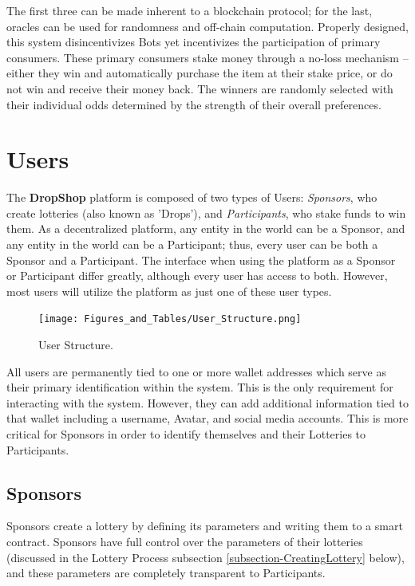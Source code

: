 \documentclass[runningheads]{llncs}
\begin{document}
The first three can be made inherent to a blockchain protocol; for the last, oracles can be used for randomness and off-chain computation.  Properly designed, this system disincentivizes Bots yet incentivizes the participation of primary consumers.  These primary consumers stake money through a no-loss mechanism – either they win and automatically purchase the item at their stake price, or do not win and receive their money back.  The winners are randomly selected with their individual odds determined by the strength of their overall preferences.


\section{Users}\label{section-Users}

The \textbf{DropShop} platform is composed of two types of Users: \emph{Sponsors}, who create lotteries (also known as 'Drops'), and \emph{Participants}, who stake funds to win them.  As a decentralized platform, any entity in the world can be a Sponsor, and any entity in the world can be a Participant; thus, every user can be both a Sponsor and a Participant.  The interface when using the platform as a Sponsor or Participant differ greatly, although every user has access to both.  However, most users will utilize the platform as just one of these user types.

\begin{figure}[H]
\centering
\texttt{[image: Figures\_and\_Tables/User\_Structure.png]}
\caption{User Structure.}
\end{figure}

All users are permanently tied to one or more wallet addresses which serve as their primary identification within the system.  This is the only requirement for interacting with the system. However, they can add additional information tied to that wallet including a username, Avatar, and social media accounts.  This is more critical for Sponsors in order to identify themselves and their Lotteries to Participants.

\subsection{Sponsors}\label{subsection-Sponsors}
Sponsors create a lottery by defining its parameters and writing them to a smart contract.  Sponsors have full control over the parameters of their lotteries (discussed in the Lottery Process subsection \ref{subsection-CreatingLottery} below), and these parameters are completely transparent to Participants.   
\end{document}
